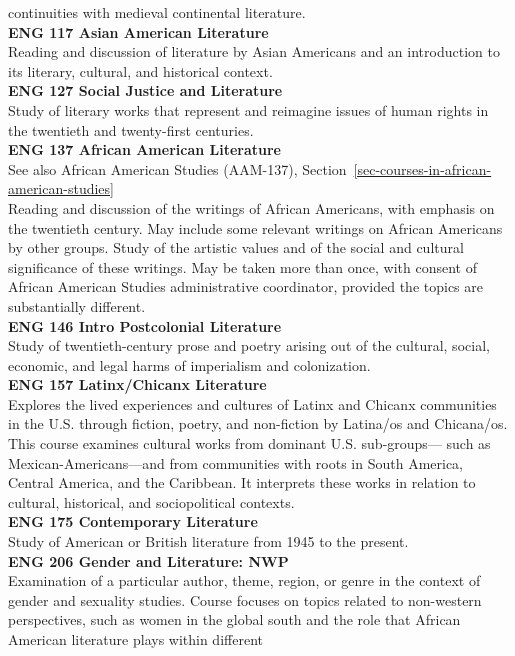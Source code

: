 \documentclass[
  letterpaper,
]{scrbook}
\begin{document}
continuities with medieval continental literature.\\
\textbf{ENG 117 Asian American Literature}\\
Reading and discussion of literature by Asian Americans and an
introduction to its literary, cultural, and historical context.\\
\textbf{ENG 127 Social Justice and Literature}\\
Study of literary works that represent and reimagine issues of human
rights in the twentieth and twenty-first centuries.\\
\textbf{ENG 137 African American Literature}\\
See also African American Studies (AAM-137),
Section~\ref{sec-courses-in-african-american-studies}\\
Reading and discussion of the writings of African Americans, with
emphasis on the twentieth century. May include some relevant writings on
African Americans by other groups. Study of the artistic values and of
the social and cultural significance of these writings. May be taken
more than once, with consent of African American Studies administrative
coordinator, provided the topics are substantially different.\\
\textbf{ENG 146 Intro Postcolonial Literature}\\
Study of twentieth-century prose and poetry arising out of the cultural,
social, economic, and legal harms of imperialism and colonization.\\
\textbf{ENG 157 Latinx/Chicanx Literature}\\
Explores the lived experiences and cultures of Latinx and Chicanx
communities in the U.S. through fiction, poetry, and non-fiction by
Latina/os and Chicana/os. This course examines cultural works from
dominant U.S. sub-groups--- such as Mexican-Americans---and from
communities with roots in South America, Central America, and the
Caribbean. It interprets these works in relation to cultural,
historical, and sociopolitical contexts.\\
\textbf{ENG 175 Contemporary Literature}\\
Study of American or British literature from 1945 to the present.\\
\textbf{ENG 206 Gender and Literature: NWP}\\
Examination of a particular author, theme, region, or genre in the
context of gender and sexuality studies. Course focuses on topics
related to non-western perspectives, such as women in the global south
and the role that African American literature plays within different
\end{document}
